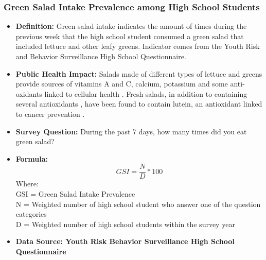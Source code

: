 \documentclass[12pt,letterpaper]{report}
\begin{document}
		\subsubsection{Green Salad Intake Prevalence among High School Students} 
	\begin{itemize}
		\item \textbf{Definition:} Green salad intake indicates the amount of times during the previous week that the high school student consumed a green salad that included lettuce and other leafy greens.  Indicator comes from the Youth Risk and Behavior Surveillance High School Questionnaire.
		\item \textbf{Public Health Impact:} Salads made of different types of lettuce and greens provide sources of vitamins A and C, calcium, potassium and some anti-oxidants linked to cellular health  \cite{ryder2002new}. Fresh salads, in addition to containing several antioxidants \cite{heimler2007polyphenol}, have been found to contain lutein, an antioxidant linked to cancer prevention \cite{khoo2011carotenoids}.
		\item \textbf{Survey Question:} During the past 7 days, how many times did you eat green salad?
		\item \textbf{Formula:} 
			\begin{equation}
				GSI = \frac{N}{D} *100
			\end{equation}
Where: \\
			GSI = Green Salad Intake Prevalence\\
			
			N = Weighted number of high school student who answer one of the question categories\\
			
			D = Weighted number of high school students within the survey year \\
			
		\item \textbf{Data Source: Youth Risk Behavior Surveillance High School Questionnaire}
	\end{itemize}

\end{document}
